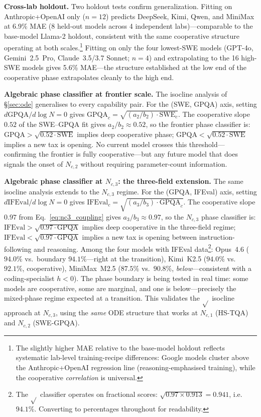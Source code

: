 \documentclass[11pt]{article}
\begin{document}
\textbf{Cross-lab holdout.}
Two holdout tests confirm generalization.
Fitting on Anthropic+OpenAI only ($n=12$) predicts DeepSeek, Kimi, Qwen, and MiniMax at 6.9\% MAE (8 held-out models across 4 independent labs)---comparable to the base-model Llama-2 holdout, consistent with the same cooperative structure operating at both scales.\footnote{The slightly higher MAE relative to the base-model holdout reflects systematic lab-level training-recipe differences: Google models cluster above the Anthropic+OpenAI regression line (reasoning-emphasised training), while the cooperative \emph{correlation} is universal.}
Fitting on only the four lowest-SWE models (GPT-4o, Gemini~2.5~Pro, Claude~3.5/3.7 Sonnet; $n=4$) and extrapolating to the 16 high-SWE models gives 5.6\% MAE---the structure established at the low end of the cooperative phase extrapolates cleanly to the high end.

\textbf{Algebraic phase classifier at frontier scale.}
The isocline analysis of \S\ref{sec:ode} generalises to every capability pair.
For the (SWE, GPQA) axis, setting $d\mathrm{GPQA}/d\log N = 0$ gives
$\mathrm{GPQA}_c = \sqrt{(a_2/b_2)\cdot\mathrm{SWE}_c}$.
The cooperative slope $0.52$ of the SWE--GPQA fit gives $a_2/b_2 \approx 0.52$,
so the frontier phase classifier is: $\mathrm{GPQA} > \sqrt{0.52\cdot\mathrm{SWE}}$ implies deep
cooperative phase; $\mathrm{GPQA} < \sqrt{0.52\cdot\mathrm{SWE}}$ implies a new tax is opening.
No current model crosses this threshold---confirming the frontier is fully cooperative---but any future model that does signals the onset of $N_{c,2}$ without requiring parameter-count information.

\textbf{Algebraic phase classifier at $N_{c,3}$: the three-field extension.}
The same isocline analysis extends to the $N_{c,3}$ regime.
For the (GPQA, IFEval) axis, setting $d\mathrm{IFEval}/d\log N = 0$ gives
$\mathrm{IFEval}_c = \sqrt{(a_3/b_3)\cdot\mathrm{GPQA}_c}$.
The cooperative slope $0.97$ from Eq.~\ref{eq:nc3_coupling} gives $a_3/b_3 \approx 0.97$,
so the $N_{c,3}$ phase classifier is: $\mathrm{IFEval} > \sqrt{0.97\cdot\mathrm{GPQA}}$ implies deep cooperative in the three-field regime; $\mathrm{IFEval} < \sqrt{0.97\cdot\mathrm{GPQA}}$ implies a new tax is opening between instruction-following and reasoning.
Among the four models with IFEval data\footnote{The $\sqrt{}$ classifier operates on fractional scores: $\sqrt{0.97 \times 0.913} = 0.941$, i.e.\ $94.1\%$. Converting to percentages throughout for readability.}: Opus~4.6 ($94.0\%$ vs.\ boundary $94.1\%$---right at the transition), Kimi~K2.5 ($94.0\%$ vs.\ $92.1\%$, cooperative), MiniMax~M2.5 ($87.5\%$ vs.\ $90.8\%$, \emph{below}---consistent with a coding-specialist $h < 0$).
The phase boundary is being tested in real time: some models are cooperative, some are marginal, and one is below---precisely the mixed-phase regime expected at a transition.
This validates the $\sqrt{}$ isocline approach at $N_{c,3}$, using the \emph{same} ODE structure that works at $N_{c,1}$ (HS-TQA) and $N_{c,2}$ (SWE-GPQA).
\end{document}
